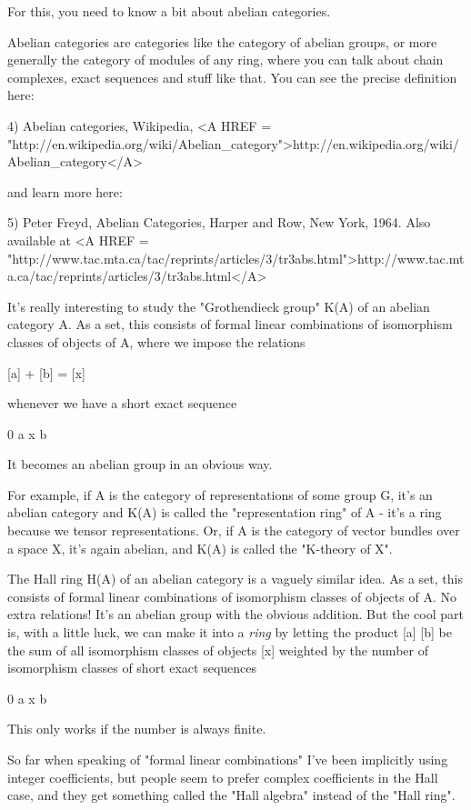 For this, you need to know a bit about abelian categories.

Abelian categories are categories like the category of abelian groups,
or more generally the category of modules of any ring, where you can 
talk about chain complexes, exact sequences and stuff like that.  
You can see the precise definition here:

4) Abelian categories, Wikipedia, 
<A HREF = "http://en.wikipedia.org/wiki/Abelian_category">http://en.wikipedia.org/wiki/Abelian_category</A>

and learn more here:

5) Peter Freyd, Abelian Categories, Harper and Row, New York, 1964.
Also available at <A HREF = "http://www.tac.mta.ca/tac/reprints/articles/3/tr3abs.html">http://www.tac.mta.ca/tac/reprints/articles/3/tr3abs.html</A>

It's really interesting to study the "Grothendieck group" K(A) of an 
abelian category A.  As a set, this consists of formal linear combinations 
of isomorphism classes of objects of A, where we impose the relations

[a] + [b] = [x]

whenever we have a short exact sequence

0 \to  a \to  x \to  b 

It becomes an abelian group in an obvious way.

For example, if A is the category of representations of some group G, 
it's an abelian category and K(A) is called the "representation ring" 
of A - it's a ring because we tensor representations.  Or, if A is the 
category of vector bundles over a space X, it's again abelian, and K(A) 
is called the "K-theory of X".  

The Hall ring H(A) of an abelian category is a vaguely similar idea.
As a set, this consists of formal linear combinations of isomorphism
classes of objects of A.  No extra relations!  It's an abelian group 
with the obvious addition.  But the cool part is, with a little luck, 
we can make it into a \emph{ring} by letting the product [a] [b] be the 
sum of all isomorphism classes of objects [x] weighted by the number 
of isomorphism classes of short exact sequences

0 \to  a \to  x \to  b 

This only works if the number is always finite.  

So far when speaking of "formal linear combinations" I've been 
implicitly using integer coefficients, but people seem to prefer 
complex coefficients in the Hall case, and they get something
called the "Hall algebra" instead of the "Hall ring".

